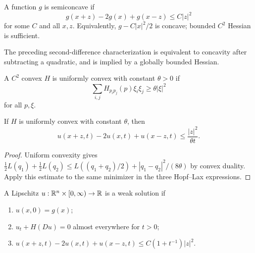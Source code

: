 \begin{definition}
\label{def:semiconcave-function}
A function $g$ is semiconcave if
\[
g(x+z)-2g(x)+g(x-z)\le C|z|^2
\]
for some $C$ and all $x,z$. Equivalently, $g-C|x|^2/2$ is concave; bounded
$C^2$ Hessian is sufficient.
\end{definition}

\begin{remark}
\label{rem:semiconcave-characterization}

The preceding second-difference characterization is equivalent to concavity
after subtracting a quadratic, and is implied by a globally bounded Hessian.
\end{remark}

\begin{definition}
\label{def:uniformly-convex-hamiltonian}
A $C^2$ convex $H$ is uniformly convex with constant $\theta>0$ if
\[
\sum_{i,j}H_{p_ip_j}(p)\xi_i\xi_j\ge\theta|\xi|^2
\]
for all $p,\xi$.
\end{definition}

\begin{lemma}
\label{lem:hopf-lax-semiconcavity-uniform-convexity}

If $H$ is uniformly convex with constant $\theta$, then
\[
u(x+z,t)-2u(x,t)+u(x-z,t)\le\frac{|z|^2}{\theta t}.
\]
\end{lemma}

\begin{proof}
\sketch Uniform convexity gives
$\frac12L(q_1)+\frac12L(q_2)\le L((q_1+q_2)/2)+|q_1-q_2|^2/(8\theta)$
by convex duality. Apply this estimate to the same minimizer in the three
Hopf--Lax expressions.
\end{proof}

\begin{definition}
\label{def:weak-solution-hamilton-jacobi}

A Lipschitz $u:\mathbb{R}^n\times[0,\infty)\to\mathbb{R}$ is a weak solution if
\begin{enumerate}
\item[(a)] $u(x,0)=g(x)$;
\item[(b)] $u_t+H(Du)=0$ almost everywhere for $t>0$;
\item[(c)] $u(x+z,t)-2u(x,t)+u(x-z,t)\le C(1+t^{-1})|z|^2$.
\end{enumerate}
\end{definition}

